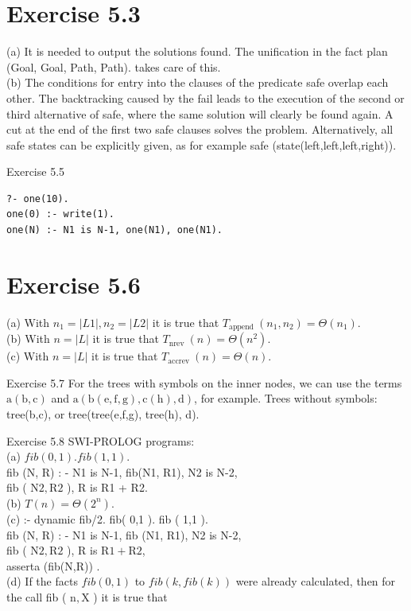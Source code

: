 \documentclass[10pt]{book}
\begin{document}
\section*{Exercise 5.3}
(a) It is needed to output the solutions found. The unification in the fact plan (Goal, Goal, Path, Path). takes care of this.\\

(b) The conditions for entry into the clauses of the predicate safe overlap each other. The backtracking caused by the fail leads to the execution of the second or third alternative of safe, where the same solution will clearly be found again. A cut at the end of the first two safe clauses solves the problem. Alternatively, all safe states can be explicitly given, as for example safe (state(left,left,left,right)).

Exercise 5.5

\begin{verbatim}
?- one(10).
one(0) :- write(1).
one(N) :- N1 is N-1, one(N1), one(N1).
\end{verbatim}

\section*{Exercise 5.6}
(a) With $n_{1}=|L 1|, n_{2}=|L 2|$ it is true that $T_{\text {append }}\left(n_{1}, n_{2}\right)=\Theta\left(n_{1}\right)$.\\
(b) With $n=|L|$ it is true that $T_{\text {nrev }}(n)=\Theta\left(n^{2}\right)$.\\
(c) With $n=|L|$ it is true that $T_{\text {accrev }}(n)=\Theta(n)$.

Exercise 5.7 For the trees with symbols on the inner nodes, we can use the terms $\mathrm{a}(\mathrm{b}, \mathrm{c})$ and $\mathrm{a}(\mathrm{b}(\mathrm{e}, \mathrm{f}, \mathrm{g}), \mathrm{c}(\mathrm{h}), \mathrm{d})$, for example. Trees without symbols: tree(b,c), or tree(tree(e,f,g), tree(h), d).

Exercise 5.8 SWI-PROLOG programs:\\
(a) $f i b(0,1) . f i b(1,1)$.\\
fib (N, R) : - N1 is N-1, fib(N1, R1), N2 is N-2,\\
fib ( $\mathrm{N} 2, \mathrm{R} 2$ ), R is R1 + R2.\\
(b) $T(n)=\Theta\left(2^{n}\right)$.\\
(c) :- dynamic fib/2. fib( 0,1 ). fib ( 1,1 ).\\
fib (N, R) : - N1 is N-1, fib (N1, R1), N2 is N-2,\\
fib ( $\mathrm{N} 2, \mathrm{R} 2$ ), R is $\mathrm{R} 1+\mathrm{R} 2$,\\
asserta (fib(N,R)) .\\
(d) If the facts $f i b(0,1)$ to $f i b(k, f i b(k))$ were already calculated, then for the call fib ( $\mathrm{n}, \mathrm{X}$ ) it is true that
\end{document}
